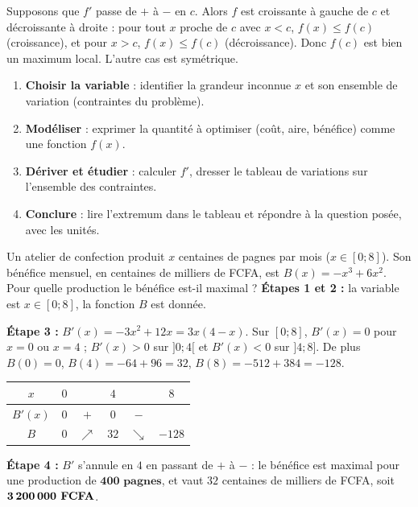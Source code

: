 \documentclass[11pt]{article}
\newcounter{popsec}
\newcounter{popsub}
\newcommand{\courssub}[1]{%
  \stepcounter{popsub}%
  \par\vspace{9pt}\noindent{\popxbold\fontsize{11.5}{13}\selectfont\color{popink}{\color{poporange}\thepopsec.\thepopsub}\hspace{6pt}#1}\par\nopagebreak\vspace{4pt}
}
\begin{document}
\begin{experience}
Supposons que $f'$ passe de $+$ à $-$ en $c$. Alors $f$ est croissante à gauche de $c$ et décroissante à droite : pour tout $x$ proche de $c$ avec $x<c$, $f(x)\le f(c)$ (croissance), et pour $x>c$, $f(x)\le f(c)$ (décroissance). Donc $f(c)$ est bien un maximum local. L'autre cas est symétrique.
\end{experience}

\courssub{Problèmes d'optimisation}

\begin{methode}
\begin{enumerate}
\item \textbf{Choisir la variable} : identifier la grandeur inconnue $x$ et son ensemble de variation (contraintes du problème).
\item \textbf{Modéliser} : exprimer la quantité à optimiser (coût, aire, bénéfice) comme une fonction $f(x)$.
\item \textbf{Dériver et étudier} : calculer $f'$, dresser le tableau de variations sur l'ensemble des contraintes.
\item \textbf{Conclure} : lire l'extremum dans le tableau et répondre à la question posée, avec les unités.
\end{enumerate}
\end{methode}

\begin{exoresolu}
Un atelier de confection produit $x$ centaines de pagnes par mois ($x\in[0;8]$). Son bénéfice mensuel, en centaines de milliers de FCFA, est $B(x)=-x^3+6x^2$. Pour quelle production le bénéfice est-il maximal ?
\tcblower
\textbf{Étapes 1 et 2 :} la variable est $x\in[0;8]$, la fonction $B$ est donnée.

\textbf{Étape 3 :} $B'(x)=-3x^2+12x=3x(4-x)$. Sur $[0;8]$, $B'(x)=0$ pour $x=0$ ou $x=4$ ; $B'(x)>0$ sur $]0;4[$ et $B'(x)<0$ sur $]4;8]$. De plus $B(0)=0$, $B(4)=-64+96=32$, $B(8)=-512+384=-128$.

\begin{center}
\begin{tabular}{|c|ccccc|}\hline
$x$ & $0$ & & $4$ & & $8$ \\ \hline
$B'(x)$ & $0$ & $+$ & $0$ & $-$ & \\ \hline
$B$ & $0$ & $\nearrow$ & $32$ & $\searrow$ & $-128$ \\ \hline
\end{tabular}
\end{center}

\textbf{Étape 4 :} $B'$ s'annule en $4$ en passant de $+$ à $-$ : le bénéfice est maximal pour une production de $\textbf{400 pagnes}$, et vaut $32$ centaines de milliers de FCFA, soit $\textbf{3\,200\,000 FCFA}$.
\end{exoresolu}
\end{document}
